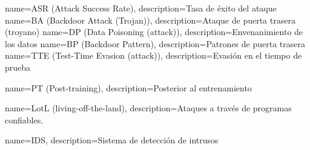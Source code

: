   {name={ASR (Attack Success Rate)},          description={Tasa de éxito del ataque}}
   {name={BA (Backdoor Attack (Trojan))},      description={Ataque de puerta trasera (troyano)}}
   {name={DP (Data Poisoning (attack))},       description={Envenanimiento de los datos}}
   {name={BP (Backdoor Pattern)},              description={Patrones de puerta trasera}}
  {name={TTE (Test-Time Evasion (attack))},   description={Evasión en el tiempo de prueba}}


  {name={PT (Post-training)},   description={Posterior al entrenamiento}}


  {name={LotL (living-off-the-land)},   description={Ataques a través de programas confiables.}}

    {name={IDS},          description={Sistema de detección de intrusos}}


